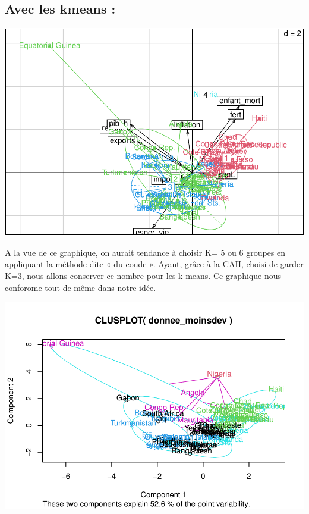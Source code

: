 \documentclass[
]{article}
\newenvironment{Shaded}{}{}
\newcommand{\AttributeTok}[1]{#1}
\newcommand{\DecValTok}[1]{#1}
\newcommand{\FunctionTok}[1]{#1}
\newcommand{\NormalTok}[1]{#1}
\newcommand{\OtherTok}[1]{\textcolor[rgb]{1.00,0.25,0.00}{#1}}
\newcommand{\SpecialCharTok}[1]{\textcolor[rgb]{0.00,0.50,0.50}{#1}}
\begin{document}
\hypertarget{avec-les-kmeans}{%
\subsection{Avec les kmeans :}\label{avec-les-kmeans}}

\includegraphics{Projet_files/figure-latex/unnamed-chunk-37-1.pdf}

A la vue de ce graphique, on aurait tendance à choisir K= 5 ou 6 groupes
en appliquant la méthode dite « du coude ». Ayant, grâce à la CAH,
choisi de garder K=3, nous allons conserver ce nombre pour les k-means.
Ce graphique nous conforome tout de même dans notre idée.

\begin{Shaded}
\end{Shaded}

\includegraphics{Projet_files/figure-latex/unnamed-chunk-38-1.pdf}
\end{document}
